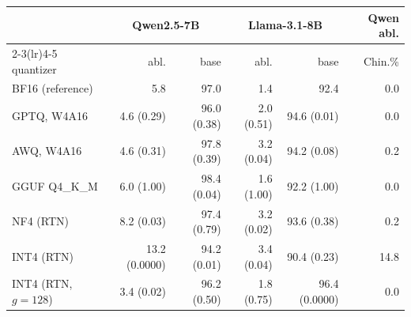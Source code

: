 \setlength{\tabcolsep}{3pt}
\begin{tabular}{@{}l r r r r r@{}}
\toprule
& \multicolumn{2}{c}{Qwen2.5-7B} & \multicolumn{2}{c}{Llama-3.1-8B} & Qwen abl. \\
\cmidrule(lr){2-3}\cmidrule(lr){4-5}
quantizer & abl. & base & abl. & base & Chin.\% \\
\midrule
BF16 (reference) & 5.8 & 97.0 & 1.4 & 92.4 & 0.0 \\
GPTQ, W4A16 & 4.6 (0.29) & 96.0 (0.38) & 2.0 (0.51) & 94.6 (0.01) & 0.0 \\
AWQ, W4A16 & 4.6 (0.31) & 97.8 (0.39) & 3.2 (0.04) & 94.2 (0.08) & 0.2 \\
GGUF Q4\_K\_M & 6.0 (1.00) & 98.4 (0.04) & 1.6 (1.00) & 92.2 (1.00) & 0.0 \\
NF4 (RTN) & 8.2 (0.03) & 97.4 (0.79) & 3.2 (0.02) & 93.6 (0.38) & 0.2 \\
INT4 (RTN) & 13.2 (0.0000) & 94.2 (0.01) & 3.4 (0.04) & 90.4 (0.23) & 14.8 \\
INT4 (RTN, $g\!=\!128$) & 3.4 (0.02) & 96.2 (0.50) & 1.8 (0.75) & 96.4 (0.0000) & 0.0 \\
\bottomrule
\end{tabular}
